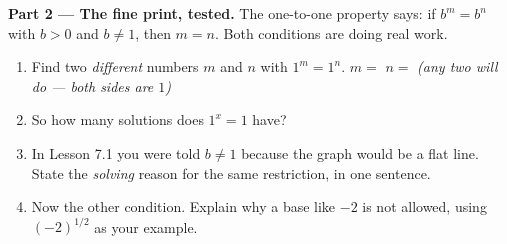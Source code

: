 \documentclass[10pt]{article}
\begin{document}
\begin{tcolorbox}[colback=white, colframe=black!40, title=\textbf{Tier E --- Extension},
    fonttitle=\bfseries, arc=1.5mm, left=3mm, right=3mm, top=2mm, bottom=2mm, breakable]
\vspace{6pt}
\textbf{Part 2 --- The fine print, tested.} The one-to-one property says: if $b^{m}=b^{n}$ with $b>0$
and $b\neq1$, then $m=n$. Both conditions are doing real work.
\begin{enumerate}[label=(\alph*), leftmargin=1.9em, itemsep=6pt]
  \item Find two \emph{different} numbers $m$ and $n$ with $1^{m}=1^{n}$. \; $m=$ 
        \quad $n=$  \quad \emph{(any two will do --- both sides are $1$)}
  \item So how many solutions does $1^{x}=1$ have? 
  \item In Lesson 7.1 you were told $b\neq1$ because the graph would be a flat line. State the
        \emph{solving} reason for the same restriction, in one sentence.
  \item Now the other condition. Explain why a base like $-2$ is not allowed, using
        $(-2)^{1/2}$ as your example.
\end{enumerate}


\end{tcolorbox}
\end{document}
